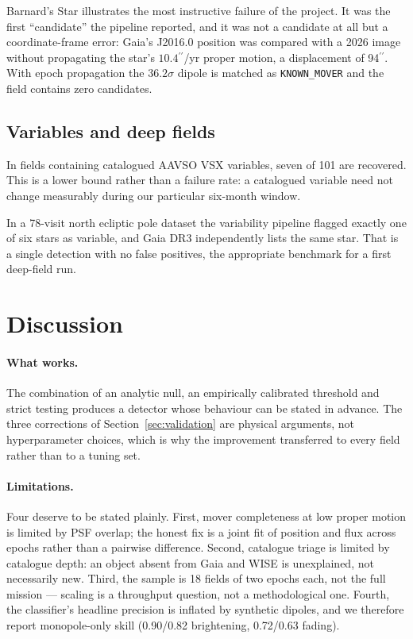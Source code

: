 \documentclass[11pt,a4paper]{article}
\newcommand{\code}[1]{\texttt{\small #1}}
\newcommand{\arcsec}{\ensuremath{{}^{\prime\prime}}}
\begin{document}
{Barnard's Star illustrates the most instructive failure of the project. It was the first
``candidate'' the pipeline reported, and it was not a candidate at all but a coordinate-frame error:
Gaia's J2016.0 position was compared with a 2026 image without propagating the star's
$10.4\arcsec$/yr proper motion, a displacement of 94$\arcsec$. With epoch propagation the
$36.2\sigma$ dipole is matched as \code{KNOWN\_MOVER} and the field contains zero candidates.

\subsection{Variables and deep fields}
In fields containing catalogued AAVSO VSX variables, seven of 101 are recovered. This is a lower
bound rather than a failure rate: a catalogued variable need not change measurably during our
particular six-month window.

In a 78-visit north ecliptic pole dataset the variability pipeline flagged exactly one of six stars
as variable, and Gaia DR3 independently lists the same star. That is a single detection with no false
positives, the appropriate benchmark for a first deep-field run.


\section{Discussion}

\paragraph{What works.} The combination of an analytic null, an empirically calibrated threshold and
strict testing produces a detector whose behaviour can be stated in advance. The three corrections
of Section~\ref{sec:validation} are physical arguments, not hyperparameter choices, which is why the
improvement transferred to every field rather than to a tuning set.

\paragraph{Limitations.} Four deserve to be stated plainly. First, mover completeness at low proper
motion is limited by PSF overlap; the honest fix is a joint fit of position and flux across epochs
rather than a pairwise difference. Second, catalogue triage is limited by catalogue depth: an object
absent from Gaia and WISE is unexplained, not necessarily new. Third, the sample is 18 fields of two
epochs each, not the full mission --- scaling is a throughput question, not a methodological one.
Fourth, the classifier's headline precision is inflated by synthetic dipoles, and we therefore report
monopole-only skill (0.90/0.82 brightening, 0.72/0.63 fading).

}
\end{document}
